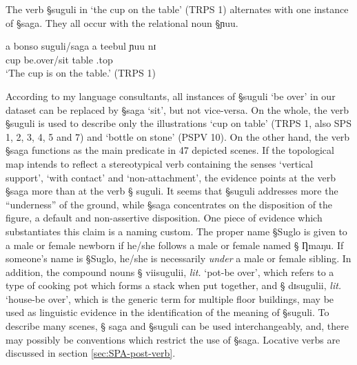 

The verb {\S suguli} in `the cup on the table' (TRPS 1) alternates with one
instance of {\S saga}. They all occur with the relational noun {\S ɲuu}. 

 \begin{exe}
 \ex\label{ex:TRPS-1}

 \gll a bonso suguli/saga a teebul ɲuu nɪ \\
{\art} cup be.over/sit  {\art} table {\reln .top} {\postp}\\
 \glt `The cup is on the table.' (TRPS 1)

 \end{exe}

According to my language consultants, all instances of {\S suguli} `be over' in
our dataset can be replaced by {\S saga} `sit', but not vice-versa. On the
whole, the verb {\S suguli} is used   to describe only the illustrations
`cup on table' (TRPS 1, also SPS 1, 2, 3, 4, 5 and 7)  and  `bottle on stone'
(PSPV 10). On the
other hand,  
the verb  {\S saga} functions as the main predicate in 47 depicted scenes.  If
the topological map intends to reflect a
stereotypical verb containing the senses  `vertical support', `with contact'
and 
`non-attachment', the evidence points at the verb {\S saga} more than at the
verb {\S
suguli}. It
seems  that {\S suguli} addresses more the ``underness'' of the ground, while 
{\S saga} concentrates on the disposition of the figure,  a default and
non-assertive disposition. One  piece of evidence
which substantiates this claim is a naming custom. The proper name {\S Suglo} is
given to a male or female newborn if he/she follows a male or female named {\S
 Ƞmaŋu}. If someone's name is {\S Suglo}, he/she is necessarily 
{\it under} a male or female sibling. In addition,  the
compound nouns {\S
viisugulii}, {\it lit.} `pot-be over', which refers 
to a  type of cooking pot which forms a stack when put together,  and {\S
dɪsugulii}, {\it lit.}  `house-be over',  which is the generic term for  
multiple floor buildings, may be used as linguistic evidence in the
identification of the meaning of   {\S suguli}. To describe many scenes,
{\S
saga}  and {\S suguli} can be used
interchangeably, and, there may possibly be conventions which restrict the use
of  {\S saga}.  Locative verbs are discussed in section
\ref{sec:SPA-post-verb}.

